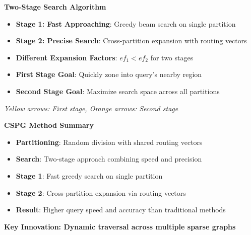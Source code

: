 \begin{frame}
\begin{center}
\Large\textbf{Two-Stage Search Algorithm}
\end{center}

\vspace{0.3cm}

\begin{itemize}
    \item \textbf{Stage 1: Fast Approaching}: Greedy beam search on single partition
    \item \textbf{Stage 2: Precise Search}: Cross-partition expansion with routing vectors
    \item \textbf{Different Expansion Factors}: $ef_1 < ef_2$ for two stages
    \item \textbf{First Stage Goal}: Quickly zone into query's nearby region
    \item \textbf{Second Stage Goal}: Maximize search space across all partitions
\end{itemize}

\vspace{0.3cm}
\textit{Yellow arrows: First stage, Orange arrows: Second stage}
\end{frame}%
\begin{frame}
\begin{center}
\Large\textbf{CSPG Method Summary}
\end{center}

\vspace{0.3cm}

\begin{itemize}
    \item \textbf{Partitioning}: Random division with shared routing vectors
    \item \textbf{Search}: Two-stage approach combining speed and precision
    \item \textbf{Stage 1}: Fast greedy search on single partition
    \item \textbf{Stage 2}: Cross-partition expansion via routing vectors
    \item \textbf{Result}: Higher query speed and accuracy than traditional methods
\end{itemize}

\vspace{0.5cm}

\begin{center}
\textbf{Key Innovation: Dynamic traversal across multiple sparse graphs}
\end{center}
\end{frame}%
